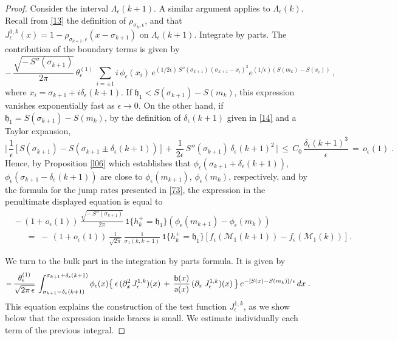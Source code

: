 \documentclass[reqno]{amsart}
\theoremstyle{plain}
\theoremstyle{definition}
\newcommand{\mf}[1]{{\mathfrak #1}}
\newcommand{\ms}[1]{{\mathscr #1}}
\newcommand{\mss}[1]{{\textsf #1}}
\newcommand{\mtt}[1]{{\mathtt #1}}
\newcounter{as}[section]
\newcommand{\<}{\langle}
\renewcommand{\>}{\rangle}
\begin{document}
\begin{proof}
Consider the interval $\Lambda_{\epsilon}(k+1)$. A similar argument
applies to $\Lambda_{\epsilon}(k)$.  Recall from \eqref{13} the
definition of $\rho_{\sigma_k,\epsilon}$, and that
$J_{\epsilon}^{1,k} (x)= 1-\rho_{\sigma_{k+1},\epsilon}
(x-\sigma_{k+1})$ on $\Lambda_{\epsilon}(k+1)$. Integrate by
parts. The contribution of the boundary terms is given by
\begin{equation*}
-\,  \frac{ \sqrt{ -\, S''(\sigma_{k+1})}}  {2\pi} \,
\theta_{\epsilon}^{(1)} \,
\sum_{i = \pm 1} i\,  \phi_{\epsilon}(x_i) \, e^{(1/2\epsilon)\, 
S''(\sigma_{k+1}) \,  (\sigma_{k+1}-x_i)^2}
e^{(1/\epsilon) (S(m_{k})-S(x_i))}\,,
\end{equation*}
where $x_i = \sigma_{k+1} + i \delta_{\epsilon}(k+1)$. If
$\mf h_1 < S(\sigma_{k+1})-S(m_{k})$, this expression vanishes
exponentially fast as $\epsilon\to 0$. On the other hand, if
$\mf h_1 = S(\sigma_{k+1})-S(m_{k})$, by the definition of
$\delta_{\epsilon}(k+1)$ given in \eqref{14} and a Taylor expansion,
\begin{equation}
\label{19}
\Big|\, 
\frac{1}{\epsilon} \,
\big[\, S(\sigma_{k+1})-S(\sigma_{k+1} \pm \delta_{\epsilon}(k+1)) \,\big]
\,+\, \frac{1}{2\epsilon} \, S''(\sigma_{k+1}) \,
\delta_{\epsilon}(k+1)^2 \,\Big| \,\le \, C_0\,
\frac{\delta_{\epsilon}(k+1)^3}{\epsilon} \,=\, o_\epsilon(1)\;.
\end{equation} 
Hence, by Proposition \ref{l06} which establishes that
$\phi_{\epsilon}(\sigma_{k+1} + \delta_{\epsilon}(k+1))$,
$\phi_{\epsilon}(\sigma_{k+1} - \delta_{\epsilon}(k+1))$ are close to
$\phi_{\epsilon}(m_{k+1})$, $\phi_{\epsilon}(m_{k})$, respectively,
and by the formula for the jump rates presented in \eqref{73},
the expression in the penultimate displayed equation is equal to
\begin{equation*}
\begin{aligned}
& -\, (1+o_\epsilon(1))\,
\frac{ \sqrt{ -\, S''(\sigma_{k+1}) }}  {2\pi} \, \mtt 1 \{h^+_k = \mf h_1\}
(\phi_{\epsilon}(m_{k+1})-\phi_{\epsilon}(m_{k})) \\
&\quad
\;=\; -\, (1+o_\epsilon(1))\, \frac{1}{\sqrt{2\pi}}\,
\frac{1}{\sigma_1(k,k+1)}\,  \mtt 1 \{h^+_k = \mf h_1\}\, 
\big[\, f_{\epsilon}(\ms M_1(k+1))-f_{\epsilon}(\ms M_1(k))\,\big] \;. 
\end{aligned}
\end{equation*} 

We turn to the bulk part in the integration by parts formula. It is
given by
\begin{equation}
\label{31}
-\, \frac{\theta_{\epsilon}^{(1)}}{\sqrt{2\pi\,\epsilon}}\,
\int_{\sigma_{k+1}-\delta_{\epsilon}(k+1)}^{\sigma_{k+1}+\delta_{\epsilon}(k+1)}
\phi_{\epsilon}(x)
\big\{\, \epsilon\, (\partial^2_x \, J_{\epsilon}^{1,k} )(x)
\,+\,  \frac{\mss b (x)}{\mss a (x)}
\, (\partial_x \, J_{\epsilon}^{1,k}) (x)\, \big\}\,
e^{-[S(x)-S(m_k)]/\epsilon} \, dx\;.
\end{equation}
This equation explains the construction of the test function
$J_{\epsilon}^{1,k}$, as we show below that the expression inside
braces is small. We estimate individually each term of the previous
integral.


\end{proof}
\end{document}
